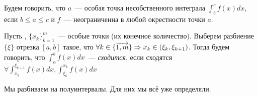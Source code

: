 \documentclass[../main.tex]{subfiles}
\begin{document}
\begin{definition}
    Будем говорить, что $a$~--- особая точка несобственного интеграла $\int_{b}^{c} f(x) dx$, если $b \leq a \leq c$ и $f$~--- неограниченна в любой окрестности точки $a$.   
\end{definition}

\begin{definition}
    Пусть \fabr, $ \{ x_k  \} _{k=1}^m $~--- особые точки (их конечное количество). Выберем разбиение $ \{ \xi \}  $ отрезка $[a, b]$ такое, что $\forall k \in {\{\overrightarrow{1,m}\}} \Rightarrow x_k \in (\xi_k, \xi_{k+1})$. Тогда будем говорить, что $\int_{a}^{b} f(x) dx$~--- \emph{сходится}, если сходятся $\forall \int_{x_k }^{\xi_{k+1}} f(x)dx, \int_{\xi_k }^{x_{k}} f(x)dx$   
\end{definition}

\begin{note}
    Мы разбиваем на полуинтервалы. Для них мы всё уже определяли. 
\end{note}
\end{document}
